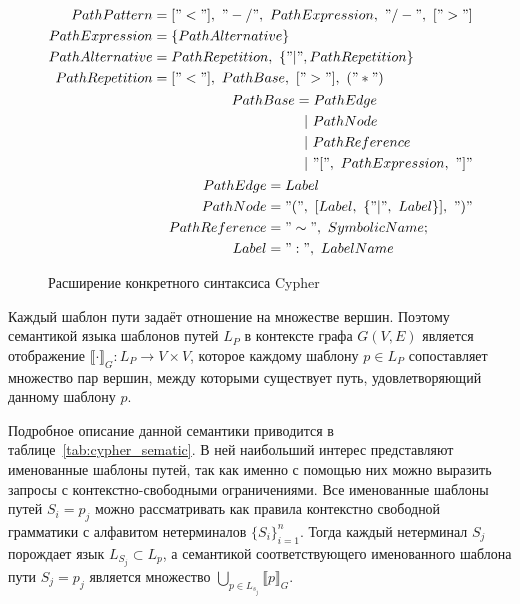 \begin{figure}[]
\begin{align*}
\begin{split}
PathPattern     &= ["<"],~"-/",~PathExpression,~"/-",~[">"]\\
PathExpression  &= \{PathAlternative\}\\
PathAlternative &= PathRepetition,~\{"|", PathRepetition\}\\
PathRepetition  &= ["<"],~PathBase,~[">"],~("*")
\end{split}\\
\begin{split}
PathBase &= PathEdge \\
         &~~|~PathNode \\
         &~~|~PathReference \\
         &~~|~"[",~PathExpression,~"]"
\end{split}\\
\begin{split}
PathEdge      &= Label \\
PathNode      &= "(",~[Label,~\{"|",~Label\}],~")" \\
PathReference &= "\sim",~SymbolicName; \\
Label         &= ":",~LabelName
\end{split}
\end{align*}
\caption{Расширение конкретного синтаксиса Cypher}
\label{fig:cypher_syntax}
\end{figure}

Каждый шаблон пути задаёт отношение на множестве вершин. Поэтому семантикой языка шаблонов путей $L_{P}$ в контексте графа $G(V, E)$ является отображение $\llbracket \cdot \rrbracket_{G}: L_P \rightarrow V \times V$, которое каждому шаблону $p\in L_P$ сопоставляет множество пар вершин, между которыми существует путь, удовлетворяющий данному шаблону $p$. 

Подробное описание данной семантики приводится в таблице~\ref{tab:cypher_sematic}.  В ней наибольший интерес представляют именованные шаблоны путей, так как именно с помощью них можно выразить запросы с контекстно-свободными ограничениями. Все именованные шаблоны путей $S_i = p_j$ можно рассматривать как правила контекстно свободной грамматики с алфавитом нетерминалов $\{S_i\}_{i=1}^n$. Тогда каждый нетерминал $S_j$ порождает язык $L_{S_j} \subset L_p$, а семантикой соответствующего именованного шаблона пути $S_j=p_j$ является множество $\bigcup\limits_{p \in L_{s_j}} \llbracket p \rrbracket_{G}$.

